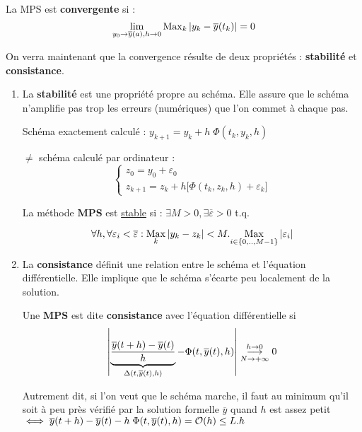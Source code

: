 \begin{fdef}
    La MPS est \textbf{convergente} si :
    \[
        \lim_{y_0\to\overline{y}(a), h\to0} \operatorname{Max}_k \left\lvert y_k - \overline{y}(t_k)\right\rvert = 0
    \]
    \label{eqdiff:def2}
\end{fdef}

On verra maintenant que la convergence résulte de deux propriétés :
\textbf{stabilité} et \textbf{consistance}.

\begin{enumerate}[label=$\to$]
    \item La \textbf{stabilité} est une propriété propre au schéma.
        Elle assure que le schéma n'amplifie pas trop les
        erreurs (numériques) que l'on commet à chaque pas.

        Schéma exactement calculé : $y_{k+1} = y_k + h \; \Phi (t_k,y_k,h)$ 
        
        $\ne$ schéma calculé par ordinateur :
        \begin{equation*}
            \left\lbrace
            \begin{array}{c}
                z_0 = y_0 + \varepsilon_0 \\
                z_{k+1} = z_k + h \big[ \Phi(t_k,z_k,h) + \varepsilon_k \big]
            \end{array}\right.
        \end{equation*}

        \begin{fdef}
            La méthode \textbf{MPS} est \underline{stable} si :
                $\exists M > 0, \exists \overline{\varepsilon} > 0$ t.q.

                \[
                    \forall h, \forall \varepsilon_i < \overline{\varepsilon} : \underset{k}{\operatorname{Max}} \left\lvert y_k-z_k\right\rvert < M . \underset{i \in \{0,..,M-1\}}{\operatorname{Max}} \left\lvert\varepsilon_i\right\rvert
                \]
        \end{fdef}

    \item La \textbf{consistance} définit une relation entre le schéma et l'équation
        différentielle. Elle implique que le schéma s'écarte peu localement de la
        solution.

        \begin{fdef}
            Une \textbf{MPS} est dite \textbf{consistance} avec l'équation différentielle si
            \[
                \left\lvert\underbrace{\frac{\overline{y}(t+h) - \overline{y}(t)}{h}}_{\Delta(t,\overline{y}(t),h)}
                - \Phi(t,\overline{y}(t),h)\right\rvert
                \overset{h\to0}{\underset{N\to+\infty}{\longrightarrow}} 0
            \]
            \label{eqdiff:def3}
        \end{fdef}

        Autrement dit, si l'on veut que le schéma marche, il faut au minimum qu'il soit
        à peu près vérifié par la solution formelle $\overline{y}$ quand $h$ est assez
        petit $\iff \overline{y}(t+h) - \overline{y}(t) - h \; \Phi (t,\overline{y}(t),h) = \mathcal{O}(h) \leq L.h$
\end{enumerate}

